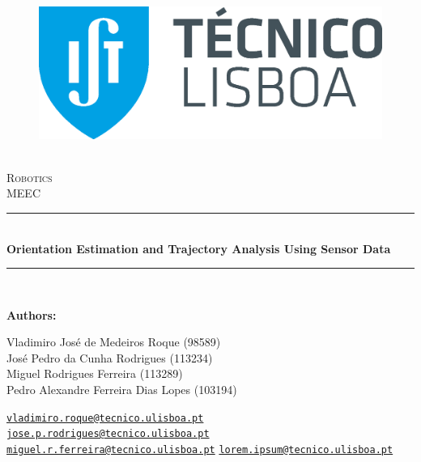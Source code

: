 \documentclass[12pt]{article}
\newcommand{\HRule}{\rule{\linewidth}{0.5mm}} %
\begin{document}
\begin{center}
    \begin{figure}
        \vspace{-1.0cm}
        \includegraphics[scale = 0.3, left]{Imagens/IST_A.eps} %
    \end{figure}
    \mbox{}\\[2.0cm]
    \textsc{\Huge Robotics}\\[2.5cm]
    \textsc{\LARGE MEEC}\\[2.0cm]
    \HRule\\[0.4cm]
    {\large \bf {\selectfont Orientation Estimation and Trajectory Analysis Using Sensor Data}}\\[0.2cm]
    \HRule\\[1.5cm]
\end{center}

\begin{flushleft}
    \textbf{\selectfont Authors:}
\end{flushleft}

\begin{center}
    \begin{minipage}{0.5\textwidth}
        \begin{flushleft}
            Vladimiro José de Medeiros Roque (98589)\\
            José Pedro da Cunha Rodrigues (113234)\\
            Miguel Rodrigues Ferreira (113289)\\
            Pedro Alexandre Ferreira Dias Lopes (103194)
        \end{flushleft}
    \end{minipage}%
    \begin{minipage}{0.5\textwidth}
        \begin{flushright}
            \href{mailto:vladimiro.roque@tecnico.ulisboa.pt}{\texttt{vladimiro.roque@tecnico.ulisboa.pt}}\\
            \href{mailto:jose.p.rodrigues@tecnico.ulisboa.pt}{\texttt{jose.p.rodrigues@tecnico.ulisboa.pt}}\\
            \href{mailto:miguel.r.ferreira@tecnico.ulisboa.pt}{\texttt{miguel.r.ferreira@tecnico.ulisboa.pt}}
            \href{mailto:lorem.ipsum@tecnico.ulisboa.pt}{\texttt{lorem.ipsum@tecnico.ulisboa.pt}}
        \end{flushright}
    \end{minipage}
\end{center}
    
\end{document}
